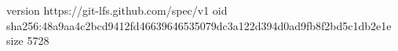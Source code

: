 version https://git-lfs.github.com/spec/v1
oid sha256:48a9aa4c2bcd9412fd46639646535079dc3a122d394d0ad9fb8f2bd5c1db2e1e
size 5728
